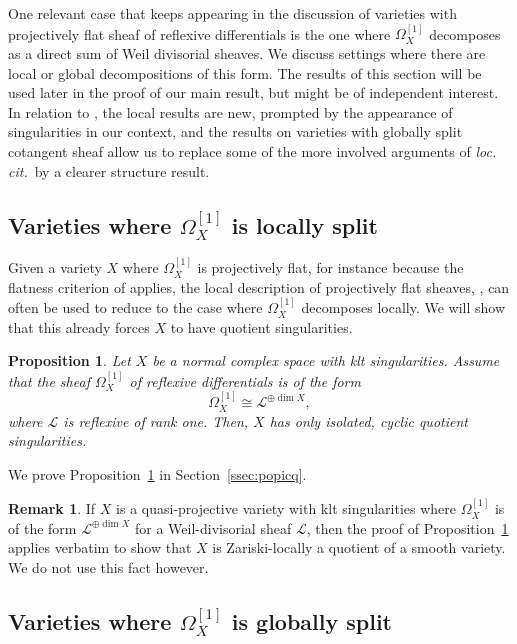 \documentclass[11pt]{article}
\providecommand{\loccit}{\emph{loc. cit.}}
\let\scr\mathscr
\let\vref\ref
\theoremstyle{plain}
\newtheorem{prop}[thm]{Proposition}
\theoremstyle{definition}
\newtheorem{rem}[thm]{Remark}
\numberwithin{equation}{thm}
\numberwithin{enumi}{thm}
\newcommand{\sL}{\scr{L}}
\begin{document}
One relevant case that keeps appearing in the discussion of varieties with
projectively flat sheaf of reflexive differentials is the one where $\Omega^{[1]}_X$
decomposes as a direct sum of Weil divisorial sheaves. We discuss settings
where there are local or global decompositions of this form. The results of
this section will be used later in the proof of our main result, but might be of
independent interest. In relation to \cite{MR3030068}, the local results are
new, prompted by the appearance of singularities in our context, and the results
on varieties with globally split cotangent sheaf allow us to replace some of the
more involved arguments of \loccit\ by a clearer structure result.

\subsection{Varieties where $\Omega^{[1]}_X$ is locally split}
\label{sect:split}

Given a variety $X$ where $\Omega^{[1]}_X$ is projectively flat, for instance because
the flatness criterion of \cite[Th.\,1.6]{GKP20a} applies, the local description
of projectively flat sheaves, \cite[Prop.\,3.11]{GKP20a}, can often be used to
reduce to the case where $\Omega^{[1]}_X$ decomposes locally. We will show that this
already forces $X$ to have quotient singularities.

\begin{prop}\label{prop:icq}
Let $X$ be a normal complex space with klt singularities. Assume that the
sheaf $\Omega^{[1]}_X$ of reflexive differentials is of the form
\begin{equation}\label{eq:icq}
\Omega^{[1]}_X \cong \sL^{\oplus \dim X},
\end{equation}
where $\sL$ is reflexive of rank one. Then, $X$ has only isolated, cyclic
quotient singularities.
\end{prop}

We prove Proposition~\ref{prop:icq} in Section~\vref{ssec:popicq}.

\begin{rem}
If $X$ is a quasi-projective variety with klt singularities where $\Omega^{[1]}_X$
is of the form $\sL^{\oplus \dim X}$ for a Weil-divisorial sheaf $\sL$, then the proof
of Proposition~\ref{prop:icq} applies verbatim to show that $X$ is
Zariski-locally a quotient of a smooth variety. We do not use this fact
however.
\end{rem}

\subsection{Varieties where $\Omega^{[1]}_X$ is globally split}
\label{sec:4-2}
\end{document}
